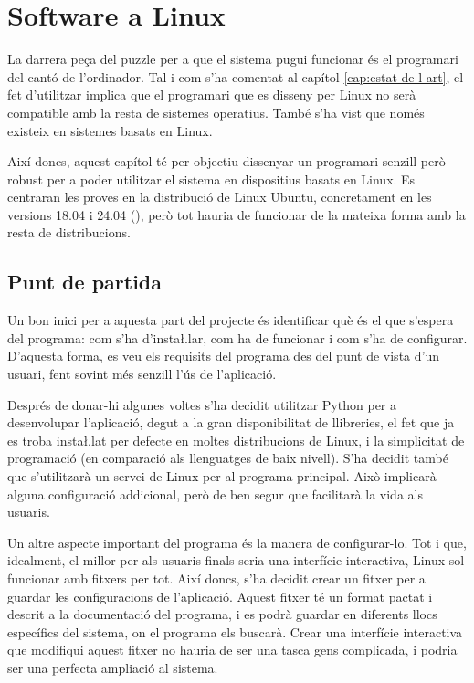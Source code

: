 \chapter{Software a Linux}

La darrera peça del puzzle per a que el sistema pugui funcionar és el
programari del cantó de l'ordinador. Tal i com s'ha comentat al capítol
\ref{cap:estat-de-l-art}, el fet d'utilitzar  implica que el
programari que es disseny per Linux no serà compatible amb la resta de
sistemes operatius. També s'ha vist que  només existeix en sistemes
basats en Linux.

Així doncs, aquest capítol té per objectiu dissenyar un programari senzill però
robust per a poder utilitzar el sistema en dispositius basats en Linux. Es
centraran les proves en la distribució de Linux Ubuntu, concretament en
les versions 18.04 i 24.04  (), però tot hauria
de funcionar de la mateixa forma amb la resta de distribucions.

\section{Punt de partida}

Un bon inici per a aquesta part del projecte és identificar què és el que
s'espera del programa: com s'ha d'insta\l.lar, com ha de funcionar i com
s'ha de configurar. D'aquesta forma, es veu els requisits del programa des del
punt de vista d'un usuari, fent sovint més senzill l'ús de l'aplicació.

Després de donar-hi algunes voltes s'ha decidit utilitzar Python per a
desenvolupar l'aplicació, degut a la gran disponibilitat de llibreries, el fet
que ja es troba insta\l.lat per defecte en moltes distribucions de Linux, i
la simplicitat de programació (en comparació als llenguatges de baix nivell).
S'ha decidit també que s'utilitzarà un servei de Linux per al programa principal.
Això implicarà alguna configuració addicional, però de ben segur que facilitarà
la vida als usuaris.

Un altre aspecte important del programa és la manera de configurar-lo. Tot i que,
idealment, el millor per als usuaris finals seria una interfície interactiva,
Linux sol funcionar amb fitxers per tot. Així doncs, s'ha decidit crear un fitxer
 per a guardar les configuracions de l'aplicació. Aquest fitxer té
un format pactat i descrit a la documentació del programa, i es podrà guardar en
diferents llocs específics del sistema, on el programa els buscarà. Crear una
interfície interactiva que modifiqui aquest fitxer no hauria de ser una tasca
gens complicada, i podria ser una perfecta ampliació al sistema.

